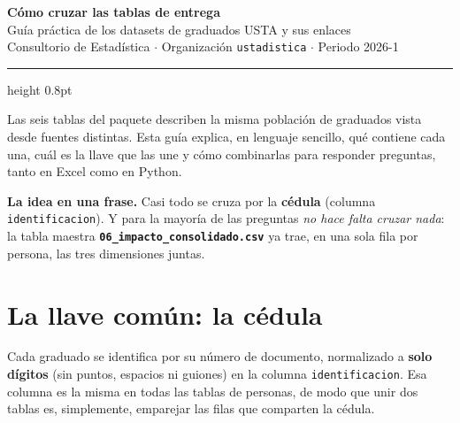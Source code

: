 \documentclass[11pt,letterpaper]{article}
\newcommand{\col}[1]{\texttt{\small #1}}
\newcommand{\file}[1]{{\small\textbf{\texttt{#1}}}}
\begin{document}
\begin{center}
  {\LARGE\bfseries\color{ustaazul} Cómo cruzar las tablas de entrega}\\[3pt]
  {\large\color{ustarojo} Guía práctica de los datasets de graduados USTA y sus enlaces}\\[4pt]
  {\footnotesize\color{ustagris} Consultorio de Estadística $\cdot$ Organización \texttt{ustadistica} $\cdot$ Periodo 2026-1}
\end{center}
\vspace{2pt}\hrule height 0.8pt\vspace{8pt}

\noindent Las seis tablas del paquete describen la misma población de graduados vista desde fuentes distintas. Esta guía explica, en lenguaje sencillo, qué contiene cada una, cuál es la llave que las une y cómo combinarlas para responder preguntas, tanto en Excel como en Python.

\begin{caja}
\textbf{La idea en una frase.} Casi todo se cruza por la \textbf{cédula} (columna \col{identificacion}). Y para la mayoría de las preguntas \emph{no hace falta cruzar nada}: la tabla maestra \file{06\_impacto\_consolidado.csv} ya trae, en una sola fila por persona, las tres dimensiones juntas.
\end{caja}

\section{La llave común: la cédula}

Cada graduado se identifica por su número de documento, normalizado a \textbf{solo dígitos} (sin puntos, espacios ni guiones) en la columna \col{identificacion}. Esa columna es la misma en todas las tablas de personas, de modo que unir dos tablas es, simplemente, emparejar las filas que comparten la cédula.
\end{document}
